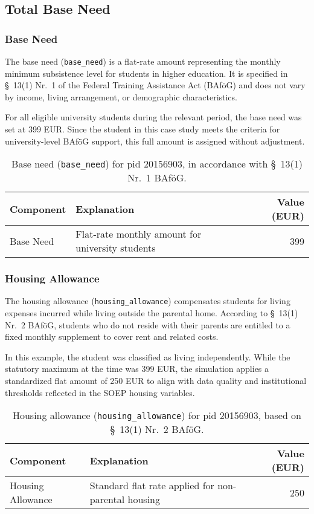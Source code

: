 \subsection{Total Base Need}
\subsubsection{Base Need}
The base need (\texttt{base\_need}) is a flat-rate amount representing the monthly minimum subsistence level for students in higher education. It is specified in §~13(1) Nr.~1 of the Federal Training Assistance Act (BAföG) and does not vary by income, living arrangement, or demographic characteristics.

For all eligible university students during the relevant period, the base need was set at 399 EUR. Since the student in this case study meets the criteria for university-level BAföG support, this full amount is assigned without adjustment.

\begin{table}[H]
\scriptsize
\centering
\begin{tabular}{llr}
\toprule
\textbf{Component} & \textbf{Explanation} & \textbf{Value (EUR)} \\
\midrule
Base Need & Flat-rate monthly amount for university students & 399 \\
\bottomrule
\end{tabular}
\caption{Base need (\texttt{base\_need}) for pid 20156903, in accordance with §~13(1) Nr.~1 BAföG.}
\label{table:bafoeg_base_need}
\end{table}

\subsubsection{Housing Allowance}
The housing allowance (\texttt{housing\_allowance}) compensates students for living expenses incurred while living outside the parental home. According to §~13(1) Nr.~2 BAföG, students who do not reside with their parents are entitled to a fixed monthly supplement to cover rent and related costs.

In this example, the student was classified as living independently. While the statutory maximum at the time was 399 EUR, the simulation applies a standardized flat amount of 250 EUR to align with data quality and institutional thresholds reflected in the SOEP housing variables.

\begin{table}[H]
\scriptsize
\centering
\begin{tabular}{llr}
\toprule
\textbf{Component} & \textbf{Explanation} & \textbf{Value (EUR)} \\
\midrule
Housing Allowance & Standard flat rate applied for non-parental housing & 250 \\
\bottomrule
\end{tabular}
\caption{Housing allowance (\texttt{housing\_allowance}) for pid 20156903, based on §~13(1) Nr.~2 BAföG.}
\label{table:bafoeg_housing}
\end{table}

